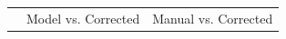 \begin{table}
\begin{tabular}{lrrrrrrrr}
                                                                                                                                                                                                                                                                                                                                                                                                                                                                                                                                                                                                                                                                                                                                                                                                                                                                                                                                                                                                              & \multicolumn{4}{c}{Model vs. Corrected} & \multicolumn{4}{c}{Manual vs. Corrected} \\

\end{tabular}
\end{table}
